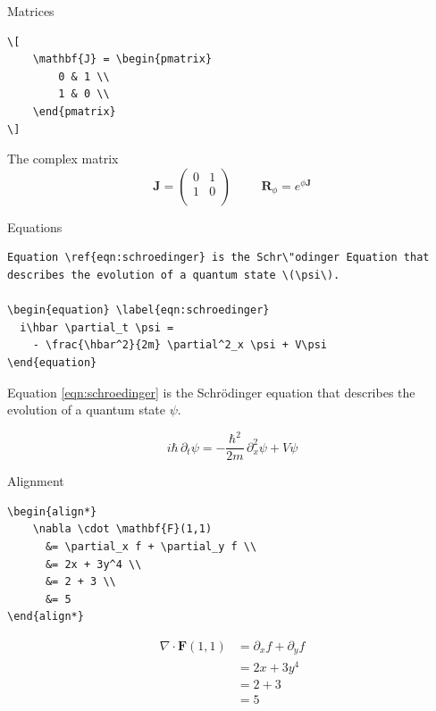 \documentclass[xetex, onlymath]{beamer}
\begin{document}
\begin{frame}[fragile]{Matrices}
\begin{lstlisting}
\[
    \mathbf{J} = \begin{pmatrix}
        0 & 1 \\
        1 & 0 \\
    \end{pmatrix}
\]
\end{lstlisting}
\begin{exampleblock}{The complex matrix}
\[
    \mathbf{J} = \begin{pmatrix}
        0 & 1 \\
        1 & 0 \\
    \end{pmatrix}
    \hspace{1cm}    
    \mathbf{R}_\phi = e^{\phi\mathbf{J}}
\]
\end{exampleblock}
\end{frame}

\begin{frame}[fragile]{Equations}
\begin{lstlisting}
Equation \ref{eqn:schroedinger} is the Schr\"odinger Equation that describes the evolution of a quantum state \(\psi\).

\begin{equation} \label{eqn:schroedinger}
  i\hbar \partial_t \psi =
    - \frac{\hbar^2}{2m} \partial^2_x \psi + V\psi
\end{equation}
\end{lstlisting}

\begin{exampleblock}{}
Equation \ref{eqn:schroedinger} is the Schr\"odinger equation that describes the evolution of a quantum state \(\psi\).

\begin{equation} \label{eqn:schroedinger}
i\hbar\, \partial_t \psi = - \frac{\hbar^2}{2m}\, \partial^2_x \psi + V\psi
\end{equation}
\end{exampleblock}
\end{frame}

\begin{frame}[fragile]{Alignment}
\begin{lstlisting}
\begin{align*}
    \nabla \cdot \mathbf{F}(1,1)
      &= \partial_x f + \partial_y f \\
      &= 2x + 3y^4 \\
      &= 2 + 3 \\
      &= 5
\end{align*}
\end{lstlisting}
\begin{exampleblock}{}
\begin{align*}
    \nabla \cdot \mathbf{F}(1,1)
      &= \partial_x f + \partial_y f \\
      &= 2x + 3y^4 \\
      &= 2 + 3 \\
      &= 5
\end{align*}
\end{exampleblock}
\end{frame}
\end{document}
